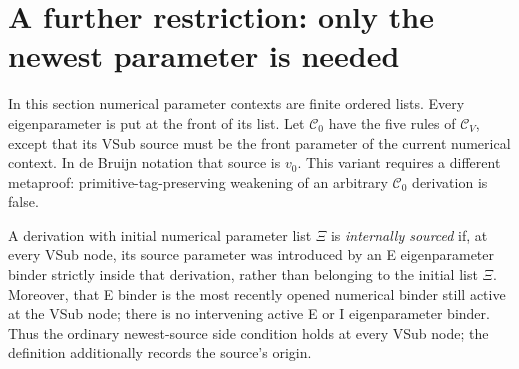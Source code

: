\section{A further restriction: only the newest parameter is needed}

In this section numerical parameter contexts are finite ordered lists.
Every eigenparameter is put at the front of its list. Let
$\mathcal C_0$ have the five rules of $\mathcal C_V$, except that its
VSub source must be the front parameter of the current numerical
context. In de Bruijn notation that source is $v_0$. This variant
requires a different metaproof: primitive-tag-preserving weakening of
an arbitrary $\mathcal C_0$ derivation is false.

\begin{definition}
A derivation with initial numerical parameter list $\Xi$ is
\emph{internally sourced} if, at every VSub node, its source parameter
was introduced by an E eigenparameter binder strictly inside that
derivation, rather than belonging to the initial list $\Xi$.
Moreover, that E binder is the most recently opened numerical binder
still active at the VSub node; there is no intervening active E or I
eigenparameter binder.
Thus the ordinary newest-source side condition holds at every
VSub node; the definition additionally records the source's origin.
\end{definition}

